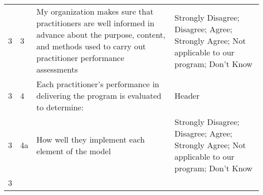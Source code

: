 \documentclass[]{article}
\begin{document}
\begin{longtable}[]{@{}llll@{}}
\begin{minipage}[t]{0.05\columnwidth}\raggedright\strut
3\strut
\end{minipage} & \begin{minipage}[t]{0.04\columnwidth}\raggedright\strut
3\strut
\end{minipage} & \begin{minipage}[t]{0.40\columnwidth}\raggedright\strut
My organization makes sure that practitioners are well informed in
advance about the purpose, content, and methods used to carry out
practitioner performance assessments\strut
\end{minipage} & \begin{minipage}[t]{0.40\columnwidth}\raggedright\strut
Strongly Disagree; Disagree; Agree; Strongly Agree; Not applicable to
our program; Don't Know\strut
\end{minipage}\tabularnewline
\begin{minipage}[t]{0.05\columnwidth}\raggedright\strut
3\strut
\end{minipage} & \begin{minipage}[t]{0.04\columnwidth}\raggedright\strut
4\strut
\end{minipage} & \begin{minipage}[t]{0.40\columnwidth}\raggedright\strut
Each practitioner's performance in delivering the program is evaluated
to determine:\strut
\end{minipage} & \begin{minipage}[t]{0.40\columnwidth}\raggedright\strut
Header\strut
\end{minipage}\tabularnewline
\begin{minipage}[t]{0.05\columnwidth}\raggedright\strut
3\strut
\end{minipage} & \begin{minipage}[t]{0.04\columnwidth}\raggedright\strut
4a\strut
\end{minipage} & \begin{minipage}[t]{0.40\columnwidth}\raggedright\strut
How well they implement each element of the model\strut
\end{minipage} & \begin{minipage}[t]{0.40\columnwidth}\raggedright\strut
Strongly Disagree; Disagree; Agree; Strongly Agree; Not applicable to
our program; Don't Know\strut
\end{minipage}\tabularnewline
\begin{minipage}[t]{0.05\columnwidth}\raggedright\strut
3\strut
\end{minipage} & \begin{minipage}[t]{0.04\columnwidth}\raggedright\strut

\end{minipage}
\end{longtable}
\end{document}

